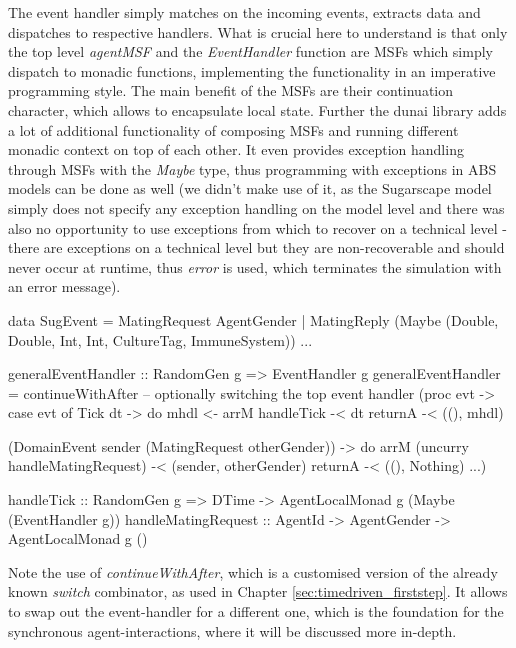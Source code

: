 The event handler simply matches on the incoming events, extracts data and dispatches to respective handlers. What is crucial here to understand is that only the top level \textit{agentMSF} and the \textit{EventHandler} function are MSFs which simply dispatch to monadic functions, implementing the functionality in an imperative programming style. The main benefit of the MSFs are their continuation character, which allows to encapsulate local state. Further the dunai library adds a lot of additional functionality of composing MSFs and running different monadic context on top of each other. It even provides exception handling through MSFs with the \textit{Maybe} type, thus programming with exceptions in ABS models can be done as well (we didn't make use of it, as the Sugarscape model simply does not specify any exception handling on the model level and there was also no opportunity to use exceptions from which to recover on a technical level - there are exceptions on a technical level but they are non-recoverable and should never occur at runtime, thus \textit{error} is used, which terminates the simulation with an error message).

\begin{HaskellCode}
data SugEvent = MatingRequest AgentGender
              | MatingReply (Maybe (Double, Double, Int, Int, CultureTag, ImmuneSystem))
              ...
              
generalEventHandler :: RandomGen g => EventHandler g
generalEventHandler =
  continueWithAfter -- optionally switching the top event handler 
    (proc evt -> 
      case evt of 
        Tick dt -> do
          mhdl <- arrM handleTick -< dt
          returnA -< ((), mhdl)

        (DomainEvent sender (MatingRequest otherGender)) -> do
          arrM (uncurry handleMatingRequest) -< (sender, otherGender)
          returnA -< ((), Nothing)
        ...)
        
handleTick :: RandomGen g => DTime -> AgentLocalMonad g (Maybe (EventHandler g))
handleMatingRequest :: AgentId -> AgentGender -> AgentLocalMonad g ()
\end{HaskellCode}

Note the use of \textit{continueWithAfter}, which is a customised version of the already known \textit{switch} combinator, as used in Chapter \ref{sec:timedriven_firststep}. It allows to swap out the event-handler for a different one, which is the foundation for the synchronous agent-interactions, where it will be discussed more in-depth.

